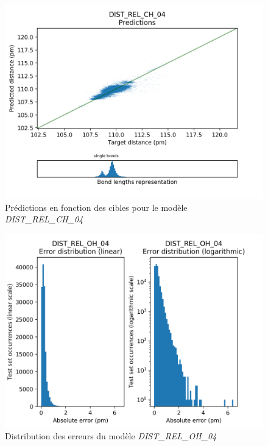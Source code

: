 \begin{figure}[!h]
	\centering
	
	\includegraphics[scale=0.8]{../figures/DIST_REL_CH_04/DIST_REL_CH_04_preds_targets.png}	
	
	\caption{Prédictions en fonction des cibles pour le modèle \emph{DIST\_REL\_CH\_04}}
	
\end{figure}


\begin{figure}[!h]
	\centering
	
	\includegraphics[scale=0.8]{../figures/DIST_REL_OH_04/DIST_REL_OH_04_distrib_rmse_val.png}	
	
	\caption{Distribution des erreurs du modèle \emph{DIST\_REL\_OH\_04}}
\end{figure}

